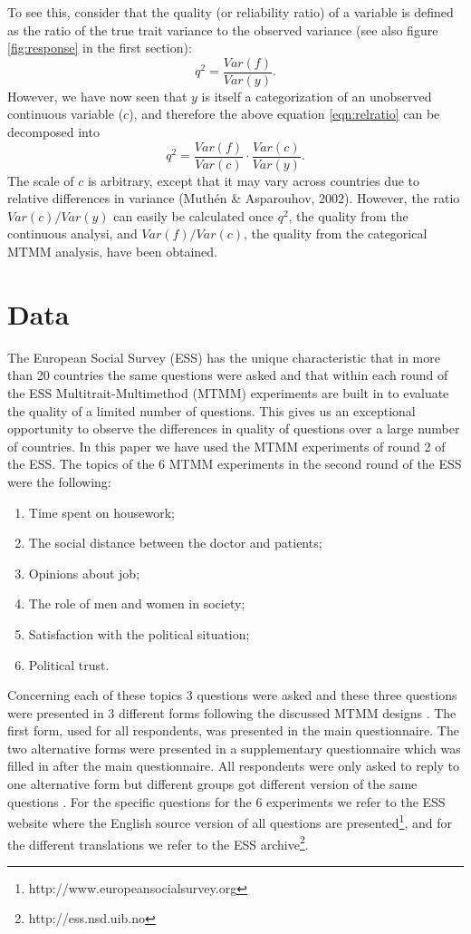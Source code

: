\documentclass[a4paper,12pt]{article}
\begin{document}
To see this, consider that the quality (or reliability ratio) of a variable is defined as the ratio of the true trait variance to the observed variance (see also figure \ref{fig:response} in the first section):
\begin{equation}
q^2 = \frac{Var(f)}{Var(y)}.\label{eqn:relratio}
\end{equation}
However, we have now seen that $y$ is itself a categorization of an unobserved continuous variable ($c$), and therefore the above equation \ref{eqn:relratio} can be decomposed into
\begin{equation}
q^2 =  \frac{ Var(f)}{Var(c)} \cdot \frac{Var(c)}{Var(y)}.		
\end{equation}
The scale of $c$ is arbitrary, except that it may vary across countries due to relative differences in variance (Muth\'en \& Asparouhov, 2002). However, the ratio $Var(c)/Var(y)$ can easily be calculated once $q^2$, the quality from the continuous analysi, and $Var(f)/Var(c)$, the quality from the categorical MTMM analysis, have been obtained.

\section{Data}


The European Social Survey (ESS) has the unique characteristic that in more than 20 countries the same questions were asked and that within each round of the ESS Multitrait-Multimethod (MTMM) experiments are built in to evaluate the quality of a limited number of questions. This gives us an exceptional opportunity to observe the differences in quality of questions over a large number of countries. In this paper we have used the MTMM experiments of round 2 of the ESS. The topics of the 6 MTMM experiments in the second round of the ESS were the following:
\begin{enumerate}
\item Time spent on housework;
\item The social distance between the doctor and patients;
\item Opinions about job;
\item The role of men and women in society;
\item Satisfaction with the political situation;
\item Political trust.
\end{enumerate}
Concerning each of these topics 3 questions were asked and these three questions were presented in 3 different forms following the discussed MTMM designs 
\cite{campbell_convergent_1959}. The first form,  used for all respondents, was presented in the main questionnaire. The two alternative forms were presented in a supplementary questionnaire which was filled in after the main questionnaire. All respondents were only asked to reply to one alternative form but different groups got different version of the same questions \cite{saris_new_2004}. For the specific questions for the 6 experiments we refer to the ESS website where the English source version of all questions are presented\footnote{http://www.europeansocialsurvey.org}, and for the different translations we refer to the ESS archive\footnote{http://ess.nsd.uib.no}.
\end{document}
